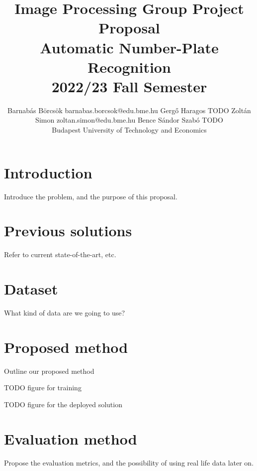 \documentclass[twoside,11pt]{article}
\begin{document}
\title{
    Image Processing Group Project Proposal\\
    Automatic Number-Plate Recognition\\
    2022/23 Fall Semester
}

\author{
    \name Barnabás Börcsök
    \email barnabas.borcsok@edu.bme.hu
    \AND
    \name Gergő Haragos
    \email TODO
   \AND
    \name Zoltán Simon
    \email zoltan.simon@edu.bme.hu
   \AND
    \name Bence Sándor Szabó 
    \email TODO
   \\\vfill\hfill\addr Budapest University of Technology and Economics
}

\maketitle

\section{Introduction}
Introduce the problem, and the purpose of this proposal.

\section{Previous solutions}
Refer to current state-of-the-art, etc.

\section{Dataset} 
What kind of data are we going to use?

\section{Proposed method}
Outline our proposed method

TODO figure for training

TODO figure for the deployed solution

\section{Evaluation method}
Propose the evaluation metrics, and the possibility of using real life data
later on.
\end{document}
